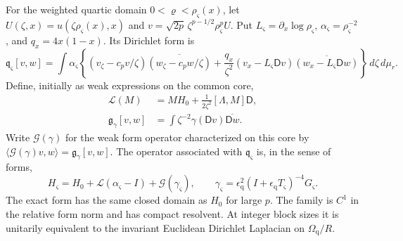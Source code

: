 \begin{proposition}\label{inf:flow-form}
For the weighted quartic domain $0<\varrho<\rho_\varsigma(x)$, let
$U(\zeta,x)=u(\zeta\rho_\varsigma(x),x)$ and
$v=\sqrt{2p}\,\zeta^{p-1/2}\rho_\varsigma^pU$. Put
$L_\varsigma=\partial_x\log\rho_\varsigma$, $\alpha_\varsigma=\rho_\varsigma^{-2}$, and
$q_x=4x(1-x)$. Its Dirichlet form is
\begin{equation}\label{inf:flow-formula}
 \mathfrak q_\varsigma[v,w]=\int\alpha_\varsigma\left\{
 (v_\zeta-c_pv/\zeta)\overline{(w_\zeta-c_pw/\zeta)}
 +\frac{q_x}{\zeta^2}(v_x-L_\varsigma\mathsf Dv)
                       \overline{(w_x-L_\varsigma\mathsf Dw)}\right\}
 \,d\zeta\,d\mu_r.
\end{equation}
Define, initially as weak expressions on the common core,
\begin{align}
 \mathcal L(M)&=MH_0+\frac1{2\zeta^2}[\Lambda,M]\mathsf D,
 \label{inf:linear-form-operator}\\
 \mathfrak g_\gamma[v,w]&=\int\zeta^{-2}\gamma
                                  (\mathsf Dv)\overline{\mathsf Dw}.
 \nonumber
\end{align}
Write $\mathcal G(\gamma)$ for the weak form operator characterized
on this core by
$\langle\mathcal G(\gamma)v,w\rangle=\mathfrak g_\gamma[v,w]$.
The operator associated with $\mathfrak q_\varsigma$ is, in the sense of forms,
\begin{equation}\label{inf:flow-exact-operator}
 H_\varsigma=H_0+\mathcal L(\alpha_\varsigma-I)+\mathcal G(\gamma_\varsigma),
 \qquad
 \gamma_\varsigma=\epsilon_{\mathrm q}^2
                   (I+\epsilon_{\mathrm q}T_\varsigma)^{-4}G_\varsigma.
\end{equation}
The exact form has the same closed domain as $H_0$ for large $p$.
The family is $C^1$ in the relative form norm and has compact
resolvent. At integer block sizes it is unitarily equivalent to the
invariant Euclidean Dirichlet Laplacian on $\Omega_{\mathrm q}/R$.
\end{proposition}
